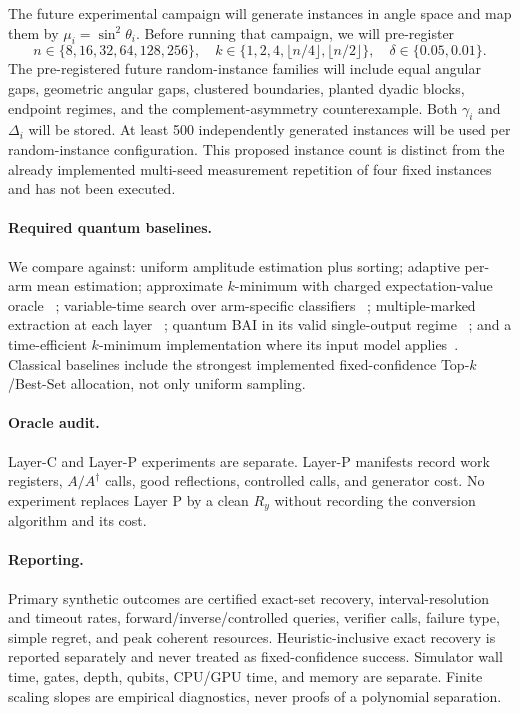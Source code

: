 \documentclass[10pt]{article}
\theoremstyle{definition}
\begin{document}
The future experimental campaign will generate instances in angle space and map
them by $\mu_i=\sin^2\theta_i$.  Before running that campaign, we will
pre-register
\[
n\in\{8,16,32,64,128,256\},\quad
k\in\{1,2,4,\lfloor n/4\rfloor,\lfloor n/2\rfloor\},\quad
\delta\in\{0.05,0.01\}.
\]
The pre-registered future random-instance families will include equal angular
gaps, geometric angular gaps, clustered boundaries, planted dyadic blocks,
endpoint regimes, and the complement-asymmetry counterexample.  Both $\gamma_i$
and $\Delta_i$ will be stored.  At least 500 independently generated instances
will be used per random-instance configuration.  This proposed instance count
is distinct from the already implemented multi-seed measurement repetition of
four fixed instances and has not been executed.

\paragraph{Required quantum baselines.}
We compare against: uniform amplitude estimation plus sorting; adaptive per-arm
mean estimation; approximate $k$-minimum with charged expectation-value oracle
~\cite{gao2025approxkmin}; variable-time search over arm-specific classifiers
~\cite{ambainis2023variable}; multiple-marked extraction at each layer
~\cite{vanapeldoorn2024marked}; quantum BAI in its valid single-output regime
~\cite{wang2021quantum}; and a time-efficient $k$-minimum implementation where
its input model applies~\cite{wang2026rmq}.  Classical baselines include the
strongest implemented fixed-confidence Top-$k$/Best-Set allocation, not only
uniform sampling.

\paragraph{Oracle audit.}
Layer-C and Layer-P experiments are separate.  Layer-P manifests record work
registers, $A/A^\dagger$ calls, good reflections, controlled calls, and generator
cost.  No experiment replaces Layer P by a clean $R_y$ without recording the
conversion algorithm and its cost.

\paragraph{Reporting.}
Primary synthetic outcomes are certified exact-set recovery, interval-resolution
and timeout rates, forward/inverse/controlled queries, verifier calls, failure
type, simple regret, and peak coherent resources.  Heuristic-inclusive exact
recovery is reported separately and never treated as fixed-confidence success.
Simulator wall time, gates, depth, qubits, CPU/GPU time, and memory are separate.
Finite scaling slopes are empirical diagnostics, never proofs of a polynomial
separation.
\end{document}
